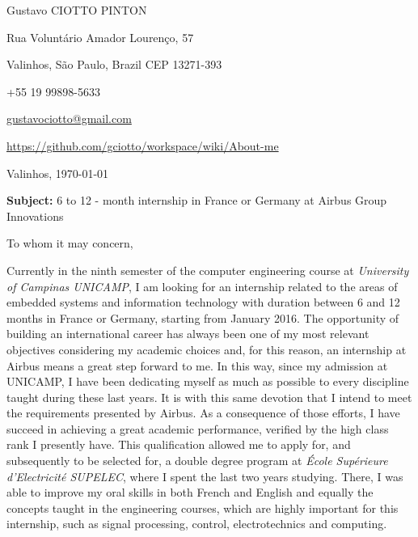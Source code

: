 \documentclass[12pt, a4paper]{article}
\begin{document}
\pagestyle{empty} 

Gustavo CIOTTO PINTON

Rua Voluntário Amador Lourenço, 57

Valinhos, São Paulo, Brazil CEP 13271-393

+55 19 99898-5633

 \url{gustavociotto@gmail.com}

\url{https://github.com/gciotto/workspace/wiki/About-me}
\begin{flushright}
\vspace{-12pt}
Valinhos,  \today





\end{flushright}

\textbf{Subject:} 6 to 12 - month internship in France or Germany at Airbus
Group Innovations 

\vspace{12pt} 

To whom it may concern, 

\vspace{12pt}
Currently in the ninth semester of the computer engineering course at
\textit{University of Campinas UNICAMP}, I am looking for an internship related
to the areas of embedded systems and information technology with duration
between 6 and 12 months in France or Germany, starting from January 2016. The
opportunity of building an international career has always been one of my most
relevant objectives considering my academic choices and, for this reason, an
internship at Airbus means a great step forward to me. In this way, since my
admission at UNICAMP, I have been dedicating myself as much as possible to every
discipline taught during these last years. It is with this same devotion that I
intend to meet the requirements presented by Airbus. As a consequence of those
efforts, I have succeed in achieving a great academic performance, verified by
the high class rank I presently have. This qualification allowed me to apply
for, and subsequently to be selected for, a double degree program at
\textit{École Supérieure d'Electricité SUPELEC}, where I spent the last two
years studying. There, I was able to improve my oral skills in both French and English and
equally the concepts taught in the engineering courses, which are highly
important for this internship, such as signal processing, control,
electrotechnics and computing.
\end{document}
